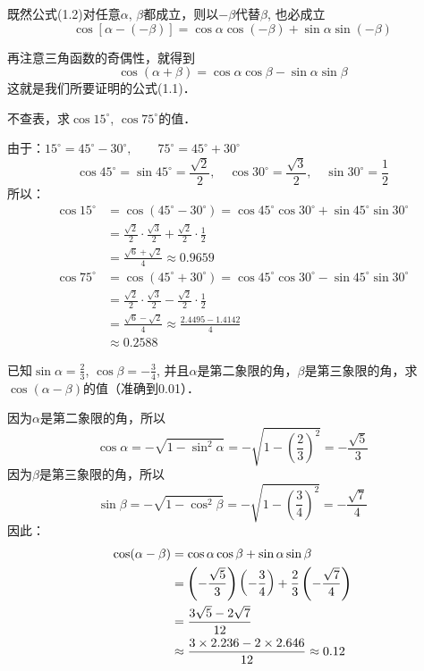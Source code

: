 既然公式(1.2)对任意$\alpha$, $\beta$都成立，则以$-\beta$代替$\beta$, 也必成立
    \[ \cos [\alpha-(-\beta)] =\cos\alpha\cos(-\beta)+\sin\alpha\sin(-\beta)\]

再注意三角函数的奇偶性，就得到
\[ \cos(\alpha+\beta) =\cos\alpha\cos\beta-\sin\alpha\sin\beta\]
这就是我们所要证明的公式(1.1)．

\begin{example}
不查表，求$\cos15^{\circ}$, $\cos75^{\circ}$的值．
\end{example}

\begin{solution}
由于：$15^{\circ}=45^{\circ}-30^{\circ},\qquad 75^{\circ}=45^{\circ}+30^{\circ}$
\[\cos 45^{\circ}=\sin 45^{\circ}=\frac{\sqrt{2}}{2},\quad \cos 30^{\circ}=\frac{\sqrt{3}}{2},\quad \sin 30^{\circ}=\frac{1}{2} \]
所以：
\[\begin{split}
\cos15^{\circ}&=\cos(45^{\circ}-30^{\circ})=\cos 45^{\circ}\cos30^{\circ}+\sin 45^{\circ}\sin30^{\circ}\\
&=\frac{\sqrt{2}}{2}\cdot \frac{\sqrt{3}}{2}+\frac{\sqrt{2}}{2}\cdot \frac{1}{2}\\
&=\frac{\sqrt{6}+\sqrt{2}}{4}\approx 0.9659 
\end{split}\]
\[\begin{split}
\cos75^{\circ}&=\cos(45^{\circ}+30^{\circ})=\cos 45^{\circ}\cos30^{\circ}-\sin 45^{\circ}\sin30^{\circ}\\
&=\frac{\sqrt{2}}{2}\cdot \frac{\sqrt{3}}{2}-\frac{\sqrt{2}}{2}\cdot \frac{1}{2}\\
&=\frac{\sqrt{6}-\sqrt{2}}{4}\approx \frac{2.4495-1.4142}{4}\\
&\approx 0.2588 
\end{split}\]
\end{solution}

\begin{example}
    已知$\sin\alpha=\frac{2}{3}$, $\cos\beta=-\frac{3}{4}$, 并且$\alpha$是第二象限的角，$\beta$是第三象限的角，求$\cos(\alpha-\beta)$的值（准确到0.01）．
\end{example}

\begin{solution}
因为$\alpha$是第二象限的角，所以
\[\cos\alpha=-\sqrt{1-\sin^2\alpha}=-\sqrt{1-\left(\frac{2}{3}\right)^2}=-\frac{\sqrt{5}}{3}\]
因为$\beta$是第三象限的角，所以
\[\sin\beta=-\sqrt{1-\cos^2\beta}=-\sqrt{1-\left(\frac{3}{4}\right)^2}=-\frac{\sqrt{7}}{4}\]
因此：
\[\begin{split}
    \cos (\alpha-\beta) &=\cos\alpha\cos\beta+\sin\alpha\sin\beta\\
    &=\left(-\dfrac{\sqrt{5}}{3}\right)\left(-\dfrac{3}{4}\right)+\dfrac{2}{3}\left(-\dfrac{\sqrt{7}}{4}\right)\\
    &=\dfrac{3\sqrt{5}-2\sqrt{7}}{12}\\
    &\approx \dfrac{3\times 2.236-2\times 2.646}{12}\approx 0.12
\end{split}\]
\end{solution}



